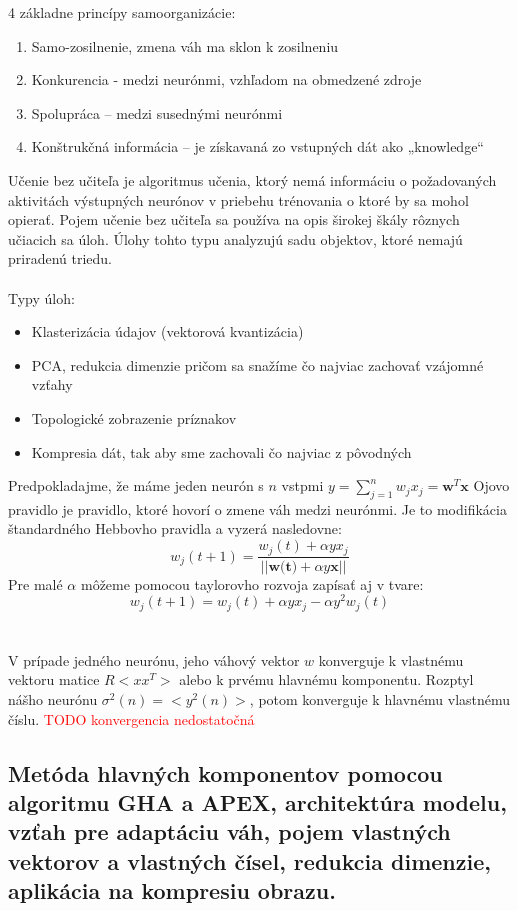 \documentclass{article}
\numberwithin{equation}{section} %
\begin{document}
4 základne princípy samoorganizácie:
\begin{enumerate}
\item Samo-zosilnenie,  zmena váh ma sklon k zosilneniu
\item Konkurencia - medzi neurónmi, vzhľadom na obmedzené zdroje
\item Spolupráca – medzi susednými neurónmi
\item Konštrukčná informácia – je získavaná zo vstupných dát ako „knowledge“
\end{enumerate}
Učenie bez učiteľa je algoritmus učenia, ktorý nemá informáciu o požadovaných aktivitách výstupných neurónov v priebehu trénovania o ktoré by sa mohol opierať. Pojem učenie bez učiteľa sa používa na opis širokej škály rôznych učiacich sa úloh. Úlohy tohto typu analyzujú sadu objektov, ktoré nemajú priradenú triedu.
\\\\
Typy úloh:
\begin{itemize}
\item Klasterizácia údajov (vektorová kvantizácia)
\item PCA, redukcia dimenzie pričom sa snažíme čo najviac zachovať vzájomné vzťahy
\item Topologické zobrazenie príznakov
\item Kompresia dát, tak aby sme zachovali čo najviac z pôvodných
\end{itemize}
Predpokladajme, že máme jeden neurón s $n$ vstpmi $y = \sum_{j=1}^n w_jx_j = \textbf{w}^T\textbf{x}$
Ojovo pravidlo je pravidlo, ktoré hovorí o zmene váh medzi neurónmi. Je to modifikácia štandardného Hebbovho pravidla a vyzerá nasledovne:
$$w_j(t+1) = \frac{w_j(t) + \alpha yx_j}{||\textbf{w(t)} + \alpha y\textbf{x}||}$$
Pre malé $\alpha$ môžeme pomocou taylorovho rozvoja zapísať aj v tvare:
$$w_j(t+1)= w_j(t)+\alpha yx_j - \alpha y^2w_j(t)$$
\\\\
V prípade jedného neurónu, jeho váhový vektor $w$ konverguje k vlastnému vektoru matice $R<xx^T>$ alebo k prvému hlavnému komponentu. Rozptyl nášho neurónu $\sigma^2(n) = <y^2(n)>$, potom konverguje k hlavnému vlastnému číslu.
\textcolor{red}{TODO konvergencia nedostatočná}

\subsection{Metóda hlavných komponentov pomocou algoritmu GHA a APEX, architektúra modelu, vzťah pre adaptáciu váh, pojem vlastných vektorov a vlastných čísel, redukcia dimenzie, aplikácia na kompresiu obrazu.}
\end{document}
